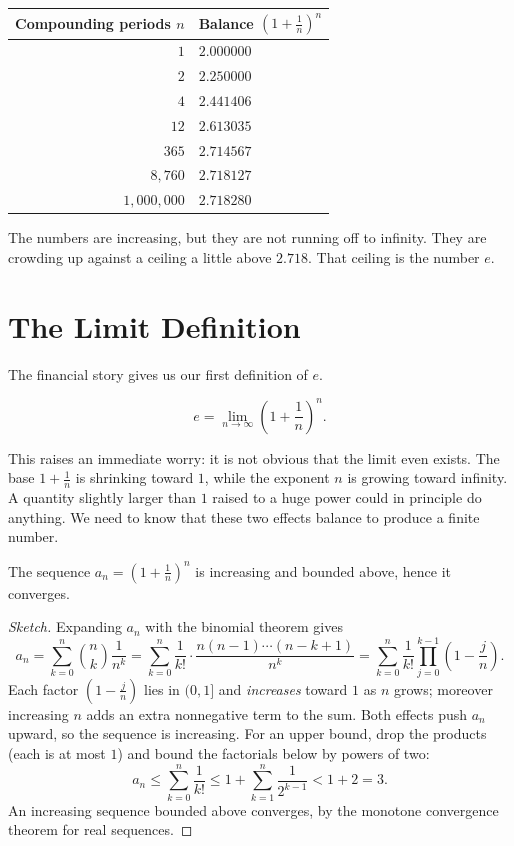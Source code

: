 \documentclass{essay}
\begin{document}
\begin{center}
  \begin{tabular}{rl}
    \hline
    Compounding periods \(n\) & Balance \(\left(1 + \tfrac{1}{n}\right)^{n}\) \\
    \hline
    \(1\) & \(2.000000\) \\
    \(2\) & \(2.250000\) \\
    \(4\) & \(2.441406\) \\
    \(12\) & \(2.613035\) \\
    \(365\) & \(2.714567\) \\
    \(8{,}760\) & \(2.718127\) \\
    \(1{,}000{,}000\) & \(2.718280\) \\
    \hline
  \end{tabular}
\end{center}

The numbers are increasing, but they are not running off to infinity. They are crowding up against a ceiling a little above \(2.718\). That ceiling is the number \(e\).

\section{The Limit Definition}

The financial story gives us our first definition of \(e\).

\begin{definition}
  \[ e = \lim_{n \to \infty} \left(1 + \frac{1}{n}\right)^{n}. \]
\end{definition}

This raises an immediate worry: it is not obvious that the limit even exists. The base \(1 + \tfrac{1}{n}\) is shrinking toward \(1\), while the exponent \(n\) is growing toward infinity. A quantity slightly larger than \(1\) raised to a huge power could in principle do anything. We need to know that these two effects balance to produce a finite number.

\begin{proposition}
  The sequence \(a_{n} = \left(1 + \tfrac{1}{n}\right)^{n}\) is increasing and bounded above, hence it converges.
\end{proposition}

\begin{proof}[Sketch]
  Expanding \(a_{n}\) with the binomial theorem gives
  \[ a_{n} = \sum_{k=0}^{n} \binom{n}{k}\frac{1}{n^{k}} = \sum_{k=0}^{n} \frac{1}{k!}\cdot\frac{n(n-1)\cdots(n-k+1)}{n^{k}} = \sum_{k=0}^{n} \frac{1}{k!}\prod_{j=0}^{k-1}\left(1 - \frac{j}{n}\right). \]
  Each factor \(\left(1 - \tfrac{j}{n}\right)\) lies in \((0,1]\) and \emph{increases} toward \(1\) as \(n\) grows; moreover increasing \(n\) adds an extra nonnegative term to the sum. Both effects push \(a_{n}\) upward, so the sequence is increasing. For an upper bound, drop the products (each is at most \(1\)) and bound the factorials below by powers of two:
  \[ a_{n} \le \sum_{k=0}^{n}\frac{1}{k!} \le 1 + \sum_{k=1}^{n}\frac{1}{2^{k-1}} < 1 + 2 = 3. \]
  An increasing sequence bounded above converges, by the monotone convergence theorem for real sequences.
\end{proof}
\end{document}
